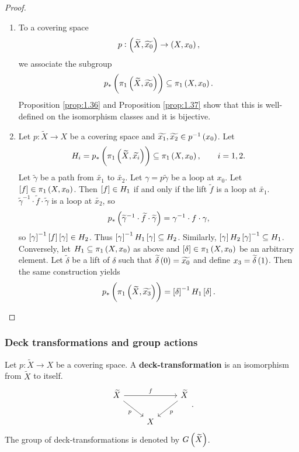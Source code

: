 \begin{proof}
\hfill
\begin{enumerate}
\item To a covering space
$$ p : \br{\widetilde{X}, \widetilde{x_0}} \to \br{X, x_0}, $$
we associate the subgroup
$$ p_*\br{\pi_1\br{\widetilde{X}, \widetilde{x_0}}} \subseteq \pi_1\br{X, x_0}. $$
Proposition \ref{prop:1.36} and Proposition \ref{prop:1.37} show that this is well-defined on the isomorphism classes and it is bijective.
\item Let $ p : \widetilde{X} \to X $ be a covering space and $ \widetilde{x_1}, \widetilde{x_2} \in p^{-1}\br{x_0} $. Let
$$ H_i = p_*\br{\pi_1\br{\widetilde{X}, \widetilde{x_i}}} \subseteq \pi_1\br{X, x_0}, \qquad i = 1, 2. $$
Let $ \widetilde{\gamma} $ be a path from $ \widetilde{x_1} $ to $ \widetilde{x_2} $. Let $ \gamma = p\widetilde{\gamma} $ be a loop at $ x_0 $. Let $ \sbr{f} \in \pi_1\br{X, x_0} $. Then $ \sbr{f} \in H_1 $ if and only if the lift $ \widetilde{f} $ is a loop at $ \widetilde{x_1} $. $ \widetilde{\gamma}^{-1} \cdot \widetilde{f} \cdot \widetilde{\gamma} $ is a loop at $ \widetilde{x_2} $, so
$$ p_*\br{\widetilde{\gamma}^{-1} \cdot \widetilde{f} \cdot \widetilde{\gamma}} = \gamma^{-1} \cdot f \cdot \gamma, $$
so $ \sbr{\gamma}^{-1}\sbr{f}\sbr{\gamma} \in H_2 $. Thus $ \sbr{\gamma}^{-1}H_1\sbr{\gamma} \subseteq H_2 $. Similarly, $ \sbr{\gamma}H_2\sbr{\gamma}^{-1} \subseteq H_1 $. Conversely, let $ H_1 \subseteq \pi_1\br{X, x_0} $ as above and $ \sbr{\delta} \in \pi_1\br{X, x_0} $ be an arbitrary element. Let $ \widetilde{\delta} $ be a lift of $ \delta $ such that $ \widetilde{\delta}\br{0} = \widetilde{x_0} $ and define $ x_3 = \widetilde{\delta}\br{1} $. Then the same construction yields
$$ p_*\br{\pi_1\br{\widetilde{X}, \widetilde{x_3}}} = \sbr{\delta}^{-1}H_1\sbr{\delta}. $$
\end{enumerate}
\end{proof}

\pagebreak

\subsubsection{Deck transformations and group actions}

\begin{definition*}
Let $ p : \widetilde{X} \to X $ be a covering space. A \textbf{deck-transformation} is an isomorphism from $ \widetilde{X} $ to itself.
$$
\begin{tikzcd}
\widetilde{X} \arrow{rr}{f} \arrow[swap]{dr}{p} & & \widetilde{X} \arrow{dl}{p} \\
& X &
\end{tikzcd}.
$$
The group of deck-transformations is denoted by $ G\br{\widetilde{X}} $.
\end{definition*}

